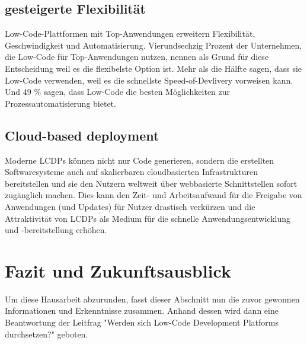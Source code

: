 \documentclass[12pt]{article} %
\begin{document}
	\subsection{gesteigerte Flexibilität}
	Low-Code-Plattformen mit Top-Anwendungen erweitern Flexibilität, Geschwindigkeit und Automatisierung. Vierundsechzig Prozent der Unternehmen, die Low-Code für Top-Anwendungen nutzen, nennen als Grund für diese Entscheidung weil es die flexibelste Option ist. 
	Mehr als die Hälfte sagen, dass sie Low-Code verwenden, weil es die schnellste Speed-of-Devlivery vorweisen kann. Und 49 \% sagen, dass Low-Code die besten Möglichkeiten zur Prozessautomatisierung bietet. \cite{EmmaVanPelt.2019}
	
	
	\subsection{Cloud-based deployment}
	Moderne LCDPs können nicht nur Code generieren, sondern die erstellten Softwaresysteme auch auf skalierbaren cloudbasierten Infrastrukturen bereitstellen und sie den Nutzern weltweit über webbasierte Schnittstellen sofort zugänglich machen. Dies kann den Zeit- und Arbeitsaufwand für die Freigabe von Anwendungen (und Updates) für Nutzer drastisch verkürzen und die Attraktivität von LCDPs als Medium für die schnelle Anwendungsentwicklung und -bereitstellung erhöhen. \cite{DiRuscio.2022}
	
	
	
	
	
	
	\section{Fazit und Zukunftsausblick}
	Um diese Hausarbeit abzurunden, fasst dieser Abschnitt nun die zuvor gewonnen Informationen und Erkenntnisse zusammen. Anhand dessen wird dann eine Beantwortung der Leitfrag "Werden sich Low-Code Development Platforms durchsetzen?" geboten. \newline
	
\end{document}
